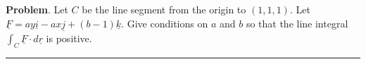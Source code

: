 \documentclass[12pt,letterpaper,noanswers]{exam}
\newcommand{\mb}[1]{\underline{#1}}
\begin{document}


\noindent\textbf{Problem}.  Let $C$ be the line segment from the origin to $(1,1,1)$.  Let $\mb F = ay\mb i -ax\mb j + (b-1)\mb k$.  Give conditions on $a$ and $b$ so that the line integral $\int_C \mb F\cdot d\mb r$ is positive.
\vfill


\vspace{0.2cm}
\hrule
\vspace{0.2cm}
\end{document}
